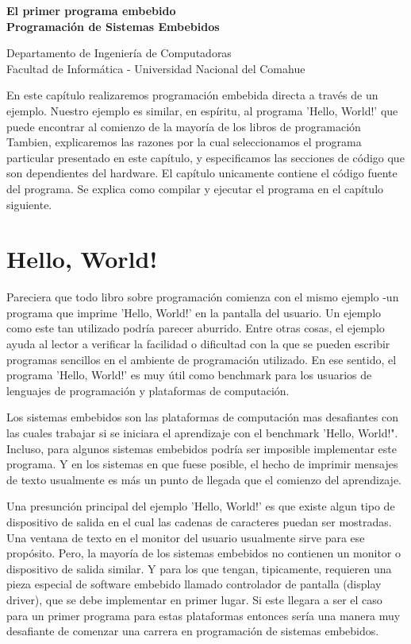 \documentclass[12pt]{article}
\def\maketitle{

 \makeatletter
 {\color{bl} \centering \huge \sc \textbf{
 El primer programa embebido\\ 
\large \vspace*{-8pt} \color{black} Programación de Sistemas Embebidos
 \vspace*{8pt} }\par}
 \makeatother


 \makeatletter
 {\centering \small 
 	Departamento de Ingeniería de Computadoras \\
 	Facultad de Informática - Universidad Nacional del Comahue \\
 	\vspace{20pt} }
 \makeatother

}
\begin{document}
\thispagestyle{empty}
\maketitle
\setlength{\parindent}{0pt}



En este capítulo realizaremos programación embebida directa a través de un ejemplo.
Nuestro ejemplo es similar, en espíritu, al programa 'Hello, World!' que puede encontrar al comienzo de la mayoría de los libros de programación
Tambien, explicaremos las razones por la cual seleccionamos el programa particular
presentado en este capítulo, y especificamos las secciones de código que son dependientes del hardware.
El capítulo unicamente contiene el código fuente del programa. Se explica como compilar y ejecutar el programa en el capítulo siguiente.

\section *{Hello, World!}

Pareciera que todo libro sobre programación comienza con el mismo ejemplo -un programa que imprime 'Hello, World!' en la pantalla del usuario. Un ejemplo como este tan utilizado podría parecer aburrido.
Entre otras cosas, el ejemplo ayuda al lector a verificar la facilidad o dificultad con la que se pueden escribir programas sencillos en el ambiente de programación utilizado. En ese sentido, el programa 'Hello, World!' es muy útil como benchmark para los usuarios de lenguajes de programación y plataformas de computación.

Los sistemas embebidos son las plataformas de computación mas desafiantes con las cuales trabajar si se iniciara el aprendizaje con el benchmark 'Hello, World!". Incluso, para algunos sistemas embebidos podría ser imposible implementar este programa. Y en los sistemas en que fuese posible, el hecho de imprimir mensajes de texto usualmente es más un punto de llegada que el comienzo del aprendizaje.

Una presunción principal del ejemplo 'Hello, World!' es que existe algun tipo de dispositivo de salida en el cual las cadenas de caracteres puedan ser mostradas. Una ventana de texto en el monitor del usuario usualmente sirve para ese propósito. Pero, la mayoría de los sistemas embebidos no contienen un monitor o dispositivo de salida similar. Y para los que tengan, tipicamente, requieren una pieza especial de software embebido llamado controlador de pantalla (display driver), que se debe implementar en primer lugar. Si este llegara a ser el caso para un primer programa para estas plataformas entonces sería una manera muy desafiante de comenzar una carrera en programación de sistemas embebidos.
\end{document}
